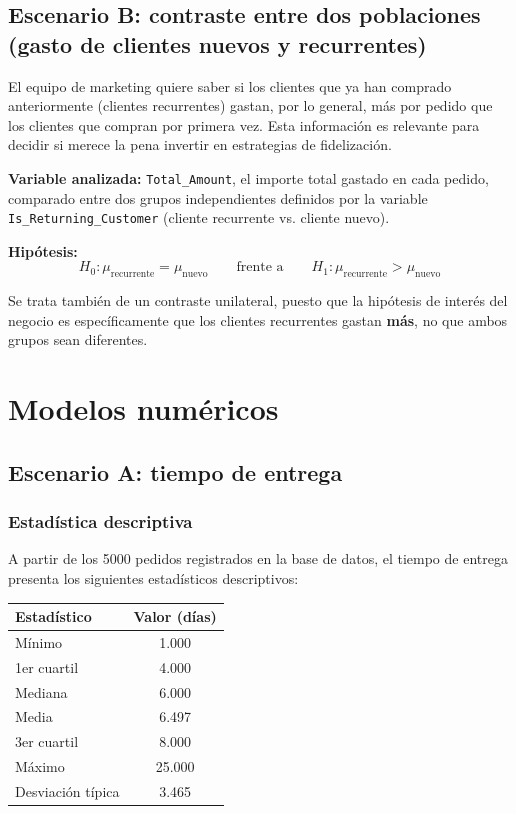 \documentclass[11pt, a4paper]{article}
\begin{document}
\subsection{Escenario B: contraste entre dos poblaciones (gasto de clientes nuevos y recurrentes)}

El equipo de marketing quiere saber si los clientes que ya han comprado anteriormente 
(clientes recurrentes) gastan, por lo general, más por pedido que los clientes que compran 
por primera vez. Esta información es relevante para decidir si merece la pena invertir en 
estrategias de fidelización.

\textbf{Variable analizada:} \texttt{Total\_Amount}, el importe total gastado en cada pedido, 
comparado entre dos grupos independientes definidos por la variable 
\texttt{Is\_Returning\_Customer} (cliente recurrente vs. cliente nuevo).

\textbf{Hipótesis:}
\[
H_0: \mu_{\text{recurrente}} = \mu_{\text{nuevo}} \qquad \text{frente a} \qquad H_1: \mu_{\text{recurrente}} > \mu_{\text{nuevo}}
\]

Se trata también de un contraste unilateral, puesto que la hipótesis de interés del negocio 
es específicamente que los clientes recurrentes gastan \textbf{más}, no que ambos grupos 
sean diferentes.

\section{Modelos numéricos}

\subsection{Escenario A: tiempo de entrega}

\subsubsection{Estadística descriptiva}

A partir de los 5000 pedidos registrados en la base de datos, el tiempo de entrega presenta 
los siguientes estadísticos descriptivos:

\begin{center}
\begin{tabular}{lc}
\toprule
Estadístico & Valor (días) \\
\midrule
Mínimo & 1.000 \\
1er cuartil & 4.000 \\
Mediana & 6.000 \\
Media & 6.497 \\
3er cuartil & 8.000 \\
Máximo & 25.000 \\
Desviación típica & 3.465 \\
\bottomrule
\end{tabular}
\end{center}
\end{document}
